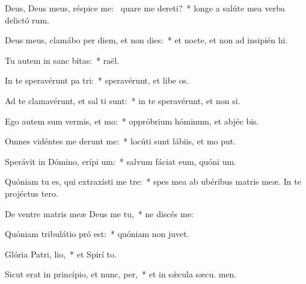 \item Deus, Deus meus, réspice  me:~\pscross{} quare me dereti?~* longe a salúte mea verba delictó rum.
\item Deus meus, clamábo per diem, et non dies:~* et nocte, et non ad insipién hi.
\item Tu autem in sanc bitas:~*  raël.
\item In te speravérunt pa tri:~* speravérunt, et libe os.
\item Ad te clamavérunt, et sal ti sunt:~* in te speravérunt, et non  si.
\item Ego autem sum vermis, et  mo:~* oppróbrium hóminum, et abjéc bis.
\item Omnes vidéntes me derunt me:~* locúti sunt lábiis, et mo put.
\item Sperávit in Dómino, erípi um:~* salvum fáciat eum, quóni  um.
\item Quóniam tu es, qui extraxísti me  tre:~* spes mea ab ubéribus matris meæ. In te projéctus   tero.
\item De ventre matris meæ Deus me  tu,~* ne discés  me:
\item Quóniam tribulátio pró est:~* quóniam non   juvet.
\item Glória Patri,  lio,~* et Spirí to.
\item Sicut erat in princípio, et nunc,  per,~* et in sǽcula sæcu. men.
